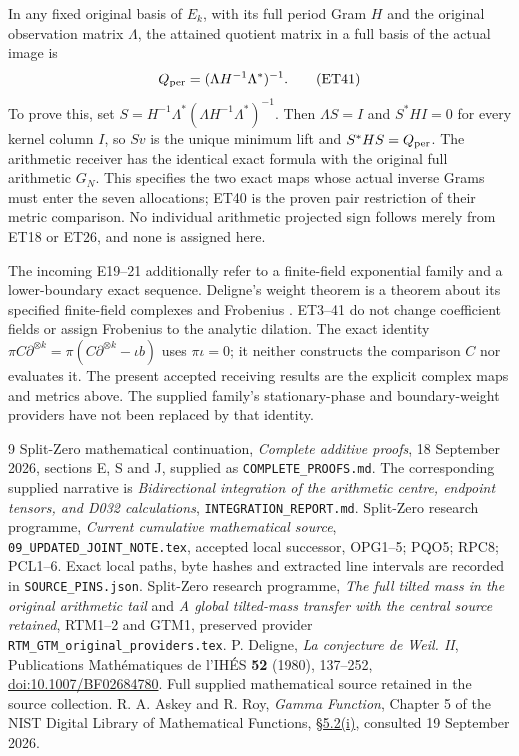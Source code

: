 \documentclass[11pt]{article}
\begin{document}
In any fixed original basis of \(E_k\), with its full period Gram
\(H\) and the original observation matrix \(\Lambda\), the attained
quotient matrix in a full basis of the actual image is
\[
 Q_{\rm per}=(\Lambda H^{-1}\Lambda^*)^{-1}.           \tag{ET41}
\]
To prove this, set
\(S=H^{-1}\Lambda^*(\Lambda H^{-1}\Lambda^*)^{-1}\).
Then \(\Lambda S=I\) and \(S^*HI=0\) for every kernel column \(I\),
so \(Sv\) is the unique minimum lift and \(S^*HS=Q_{\rm per}\).
The arithmetic receiver has the identical exact formula with the
original full arithmetic \(G_N\). This specifies the two exact
maps whose actual inverse Grams must enter the seven allocations;
ET40 is the proven pair restriction of their metric comparison.
No individual arithmetic projected sign follows merely from ET18
or ET26, and none is assigned here.

The incoming E19--21 additionally refer to a finite-field exponential
family and a lower-boundary exact sequence. Deligne's weight theorem
is a theorem about its specified finite-field complexes and Frobenius
\cite[Thm.\ 3.3.1]{Deligne}. ET3--41 do not change coefficient fields
or assign Frobenius to the analytic dilation. The exact identity
\(\pi C\partial^{\otimes k}=\pi(C\partial^{\otimes k}-\iota b)\)
uses \(\pi\iota=0\); it neither constructs the comparison \(C\) nor
evaluates it. The present accepted receiving results are the explicit
complex maps and metrics above. The supplied family's stationary-phase
and boundary-weight providers have not been replaced by that identity.

\begin{thebibliography}{9}
Split-Zero mathematical continuation,
\emph{Complete additive proofs}, 18 September 2026,
sections E, S and J, supplied as \texttt{COMPLETE\_PROOFS.md}.
The corresponding supplied narrative is
\emph{Bidirectional integration of the arithmetic centre, endpoint tensors,
and D032 calculations}, \texttt{INTEGRATION\_REPORT.md}.
Split-Zero research programme,
\emph{Current cumulative mathematical source},
\texttt{09\_UPDATED\_JOINT\_NOTE.tex}, accepted local successor,
OPG1--5; PQO5; RPC8; PCL1--6.
Exact local paths, byte hashes and extracted line intervals are
recorded in \texttt{SOURCE\_PINS.json}.
Split-Zero research programme,
\emph{The full tilted mass in the original arithmetic tail}
and \emph{A global tilted-mass transfer with the central source retained},
RTM1--2 and GTM1, preserved provider
\texttt{RTM\_GTM\_original\_providers.tex}.
P. Deligne, \emph{La conjecture de Weil. II},
Publications Math\'ematiques de l'IH\'ES \textbf{52} (1980), 137--252,
\href{https://doi.org/10.1007/BF02684780}{doi:10.1007/BF02684780}.
Full supplied mathematical source retained in the source collection.
R. A. Askey and R. Roy, \emph{Gamma Function}, Chapter 5 of the
NIST Digital Library of Mathematical Functions,
\href{https://dlmf.nist.gov/5.2}{\S5.2(i)}, consulted 19 September 2026.
\end{thebibliography}
\end{document}
